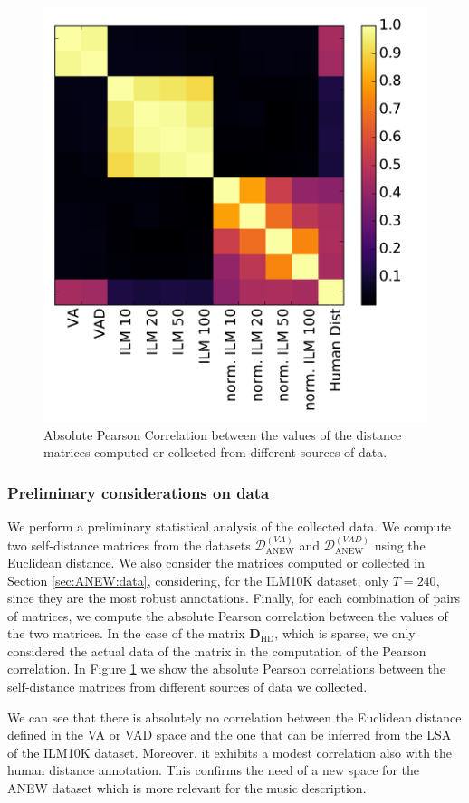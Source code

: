 \begin{figure}[bt] 
  \centering 
  \includegraphics[width=0.80\columnwidth]{img/ANEW/pearson_dist_3.pdf}
  \caption{Absolute Pearson Correlation between the values of the distance matrices computed or collected from different sources of data.}
  \label{fig:ANEWdistData}
\end{figure}  

\subsubsection{Preliminary considerations on data}
We perform a preliminary statistical analysis of the collected data. We compute two self-distance matrices from the datasets $\mathcal{D}_{\text{ANEW}}^{(VA)}$ and $\mathcal{D}_{\text{ANEW}}^{(VAD)}$ using the Euclidean distance. We also consider the matrices computed or collected in Section \ref{sec:ANEW:data}, considering, for the ILM10K dataset, only $T=240$, since they are the most robust annotations. Finally, for each combination of pairs of matrices, we compute the absolute Pearson correlation between the values of the two matrices. In the case of the matrix $\mathbf{D}_{\text{HD}}$, which is sparse, we only considered the actual data of the matrix in the computation of the Pearson correlation. In Figure \ref{fig:ANEWdistData} we show the absolute Pearson correlations between the self-distance matrices from different sources of data we collected. 

We can see that there is absolutely no correlation between the Euclidean distance defined in the VA or VAD space and the one that can be inferred from the LSA of the ILM10K dataset. Moreover, it exhibits a modest correlation also with the human distance annotation. This confirms the need of a new space for the ANEW dataset which is more relevant for the music description.

